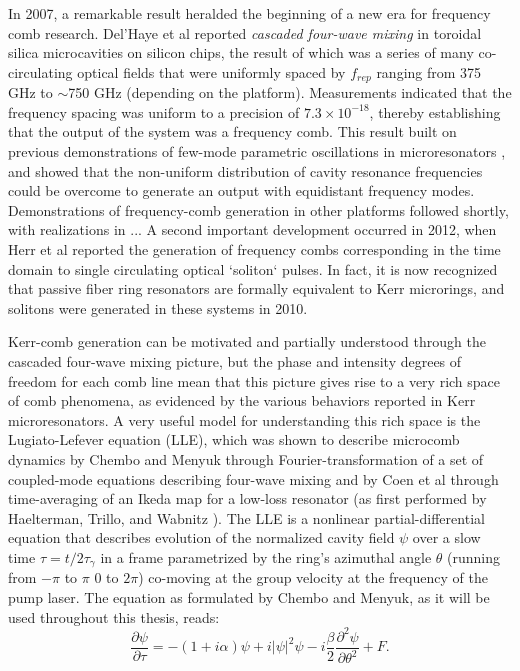 In 2007, a remarkable result heralded the beginning of a new era for frequency comb research. Del'Haye et al reported \textit{cascaded four-wave mixing} in toroidal silica microcavities on silicon chips, the result of which was a series of many co-circulating optical fields that were uniformly spaced by $f_{rep}$ ranging from 375 GHz to $\sim$750 GHz (depending on the platform)\cite{DelHaye2007}. Measurements indicated that the frequency spacing was uniform to a precision of $7.3 \times 10^{-18}$, thereby establishing that the output of the system was a frequency comb. This result built on previous demonstrations of few-mode parametric oscillations in microresonators \cite{Kippenberg2004, Savchenkov2004,Agha2007}, and showed that the non-uniform distribution of cavity resonance frequencies could be overcome to generate an output with equidistant frequency modes. Demonstrations of frequency-comb generation in other platforms followed shortly, with realizations in ... A second important development occurred in 2012, when Herr et al reported the generation of frequency combs corresponding in the time domain to single circulating optical `soliton` pulses. In fact, it is now recognized that passive fiber ring resonators are formally equivalent to Kerr microrings, and solitons were generated in these systems in 2010. 

Kerr-comb generation can be motivated and partially understood through the cascaded four-wave mixing picture, but the phase and intensity degrees of freedom for each comb line mean that this picture gives rise to a very rich space of comb phenomena, as evidenced by the various behaviors reported in Kerr microresonators. A very useful model for understanding this rich space is the Lugiato-Lefever equation (LLE), which was shown to describe microcomb dynamics by Chembo and Menyuk \cite{Chembo2013} through Fourier-transformation of a set of coupled-mode equations describing four-wave mixing and by Coen et al \cite{Coen2013} through time-averaging of an Ikeda map for a low-loss resonator (as first performed by Haelterman, Trillo, and Wabnitz \cite{Haelterman1992}).  The LLE is a nonlinear partial-differential equation that describes evolution of the normalized cavity field $\psi$ over a slow time $\tau=t/2\tau_\gamma$ in a frame parametrized by the ring's azimuthal angle $\theta$ (running from $-\pi$ to $\pi$ $0$ to $2\pi$) co-moving at the group velocity at the frequency of the pump laser. The equation as formulated by Chembo and Menyuk, as it will be used throughout this thesis, reads:
\begin{equation}
\frac{\partial \psi}{\partial \tau}=-(1+i \alpha) \psi + i|\psi|^2 \psi -i \frac{\beta}{2} \frac{\partial^2 \psi}{\partial \theta^2} +F.
\end{equation}

